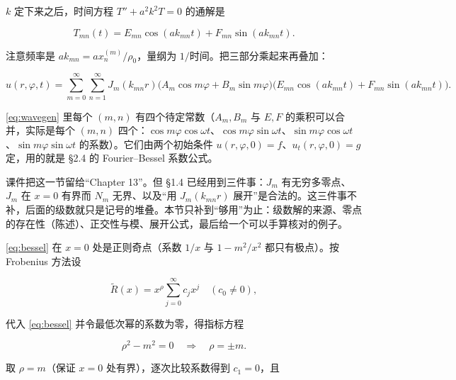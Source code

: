 \documentclass[11pt]{ctexart}
\let\origsubhdr\subhdr
\renewcommand{\subhdr}[1]{\par\needspace{3\baselineskip}\origsubhdr{#1}}
\let\orighdr\hdr
\renewcommand{\hdr}[2]{\par\needspace{6\baselineskip}\orighdr{#1}{#2}}
\begin{document}

$k$ 定下来之后，时间方程 $T''+a^2k^2T=0$ 的通解是

\[
T_{mn}(t)=E_{mn}\cos(a k_{mn}t)+F_{mn}\sin(a k_{mn}t).
\]

注意频率是 $a k_{mn}=a x_n^{(m)}/\rho_0$，量纲为 $1/$时间。把三部分乘起来再叠加：

\begin{equation}
u(r,\varphi,t)=\sum_{m=0}^{\infty}\sum_{n=1}^{\infty}J_m(k_{mn}r)\big(A_m\cos m\varphi+B_m\sin m\varphi\big)\big(E_{mn}\cos(a k_{mn}t)+F_{mn}\sin(a k_{mn}t)\big).
\label{eq:wavegen}
\end{equation}

\eqref{eq:wavegen} 里每个 $(m,n)$ 有四个待定常数（$A_m,B_m$ 与 $E,F$ 的乘积可以合并，实际是每个 $(m,n)$ 四个：$\cos m\varphi\cos\omega t$、$\cos m\varphi\sin\omega t$、$\sin m\varphi\cos\omega t$、$\sin m\varphi\sin\omega t$ 的系数）。它们由两个初始条件 $u(r,\varphi,0)=f$、$u_t(r,\varphi,0)=g$ 定，用的就是 \S2.4 的 Fourier--Bessel 系数公式。


\label{sec:s2}

课件把这一节留给“Chapter 13”。但 \S1.4 已经用到三件事：$J_m$ 有无穷多零点、$J_m$ 在 $x=0$ 有界而 $N_m$ 无界、以及“用 $J_m(k_{mn}r)$ 展开”是合法的。这三件事不补，后面的级数就只是记号的堆叠。本节只补到“够用”为止：级数解的来源、零点的存在性（陈述）、正交性与模、展开公式，最后给一个可以手算核对的例子。


\eqref{eq:bessel} 在 $x=0$ 处是正则奇点（系数 $1/x$ 与 $1-m^2/x^2$ 都只有极点）。按 Frobenius 方法设

\[
\tilde R(x)=x^{\rho}\sum_{j=0}^{\infty}c_jx^j\quad(c_0\ne0),
\]

代入 \eqref{eq:bessel} 并令最低次幂的系数为零，得指标方程

\[
\rho^2-m^2=0\quad\Longrightarrow\quad \rho=\pm m .
\]

取 $\rho=m$（保证 $x=0$ 处有界），逐次比较系数得到 $c_1=0$，且
\end{document}
